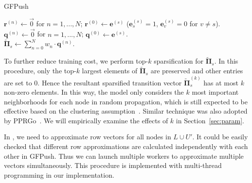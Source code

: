 \begin{algorithm}[h]
\footnotesize
\caption{GFPush}
\label{alg:GFPush}
$\mathbf{r}^{(n)} \leftarrow \vec{0}$ for $n=1,...,N$; $\mathbf{r}^{(0)} \leftarrow \mathbf{e}^{(s)}$  ($\mathbf{e}^{(s)}_s = 1$, $\mathbf{e}^{(s)}_v = 0$ for $v\neq s$).\\
$\mathbf{q}^{(n)} \leftarrow \vec{0}$ for $n=1,...,N$; $\mathbf{q}^{(0)} \leftarrow \mathbf{e}^{(s)}$.\\
$\widetilde{\mathbf{\Pi}}_s \leftarrow \sum_{n=0}^N w_n \cdot \mathbf{q}^{(n)}$.\\
\end{algorithm}


 To further reduce training cost, we perform top-$k$ sparsification for $\widetilde{\mathbf{\Pi}}_{s}$. In this procedure, only the top-$k$ largest elements of $\widetilde{\mathbf{\Pi}}_{s}$ are preserved and other entries are set to $0$.
Hence the resultant sparsified transition vector $\widetilde{\mathbf{\Pi}}^{(k)}_s$ has at most $k$ non-zero elements. 
In this way, the model only considers the $k$ most important neighborhoods for each node in random propagation, which is still expected to be effective based on the clustering assumption~\cite{chapelle2009semi}.
Similar technique was also adopted by PPRGo~\cite{bojchevski2020scaling}.
We will empirically examine the effects of $k$ in Section~\ref{sec:param}.

 In \model, we need to approximate row vectors for all nodes in $L\cup U'$. It could be easily checked that different row approximations are calculated independently with each other in GFPush. Thus we can launch multiple workers to approximate multiple vectors simultaneously. This procedure is implemented with multi-thread programming in our implementation. 











